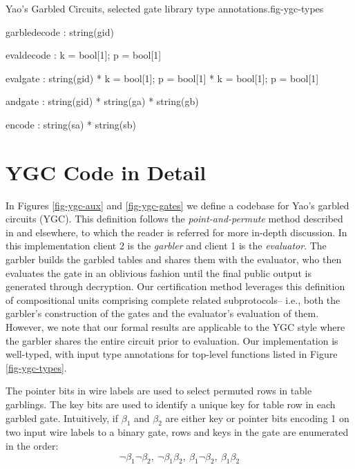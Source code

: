 \begin{fpfig}{Yao's Garbled Circuits, selected gate library type annotations.}{fig-ygc-types}
{\footnotesize
\begin{verbatimtab}
  garbledecode : string(gid)
  
  evaldecode   : { k = bool[1]; p = bool[1] }
  
  evalgate     : string(gid) *  { k = bool[1]; p = bool[1] } * { k = bool[1]; p = bool[1] }
  
  andgate      : string(gid) * string(ga) * string(gb) 

  encode       : string(sa) * string(sb)
\end{verbatimtab}
}
\end{fpfig}

  
%    

\section{YGC Code in Detail}
\label{section-ygc}

In Figures \ref{fig-ygc-aux} and \ref{fig-ygc-gates} we define a
codebase for Yao's garbled circuits (YGC). This definition follows the
\emph{point-and-permute} method described in \cite{evans2018pragmatic}
and elsewhere, to which the reader is referred for more in-depth
discussion.  In this implementation client 2 is the \emph{garbler} and
client 1 is the \emph{evaluator}. The garbler builds the garbled
tables and shares them with the evaluator, who then evaluates the gate
in an oblivious fashion until the final public output is generated
through decryption. Our certification method leverages this definition
of compositional units comprising complete related subprotocols--
i.e., both the garbler's construction of the gates and the evaluator's
evaluation of them. However, we note that our formal results are applicable
to the YGC style where the garbler shares the entire circuit prior to
evaluation. Our implementation is well-typed, with input type annotations
for top-level functions listed in Figure \ref{fig-ygc-types}.

The pointer bits in wire labels are used to select permuted rows in
table garblings. The key bits are used to identify a unique key for
table row in each garbled gate. Intuitively, if $\beta_1$ and
$\beta_2$ are either key or pointer bits encoding 1 on two input wire
labels to a binary gate, rows and keys in the gate are enumerated in
the order:
$$
\neg\beta_1\neg\beta_2,\ \neg\beta_1\beta_2,\ \beta_1\neg\beta_2,\ \beta_1\beta_2
$$

